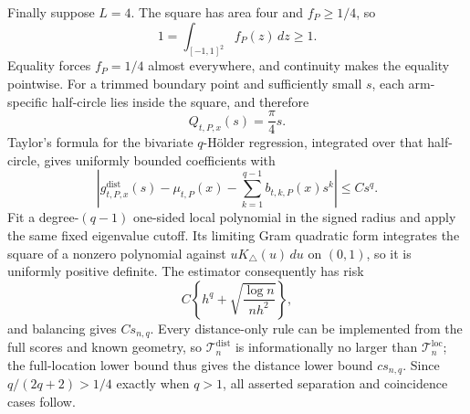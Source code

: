 Finally suppose \(L=4\).  The square has area four and \(f_P\geq1/4\), so
\[
 1=\int_{[-1,1]^2}f_P(z)\,dz\geq1.
\]
Equality forces \(f_P=1/4\) almost everywhere, and continuity makes the equality pointwise.  For a trimmed boundary point and sufficiently small \(s\), each arm-specific half-circle lies inside the square, and therefore
\[
 Q_{t,P,x}(s)=\frac\pi4s.
\]
Taylor's formula for the bivariate \(q\)-H\"older regression, integrated over that half-circle, gives uniformly bounded coefficients with
\[
 \left|g^{\mathrm{dist}}_{t,P,x}(s)-\mu_{t,P}(x)
 -\sum_{k=1}^{q-1}b_{t,k,P}(x)s^k\right|\leq Cs^q.
\]
Fit a degree-\((q-1)\) one-sided local polynomial in the signed radius and apply the same fixed eigenvalue cutoff.  Its limiting Gram quadratic form integrates the square of a nonzero polynomial against \(uK_\triangle(u)\,du\) on \((0,1)\), so it is uniformly positive definite.  The estimator consequently has risk
\[
 C\left\{h^q+\sqrt{\frac{\log n}{nh^2}}\right\},
\]
and balancing gives \(Cs_{n,q}\).  Every distance-only rule can be implemented from the full scores and known geometry, so \(\mathcal T_n^{\mathrm{dist}}\) is informationally no larger than \(\mathcal T_n^{\mathrm{loc}}\); the full-location lower bound thus gives the distance lower bound \(cs_{n,q}\).  Since \(q/(2q+2)>1/4\) exactly when \(q>1\), all asserted separation and coincidence cases follow.